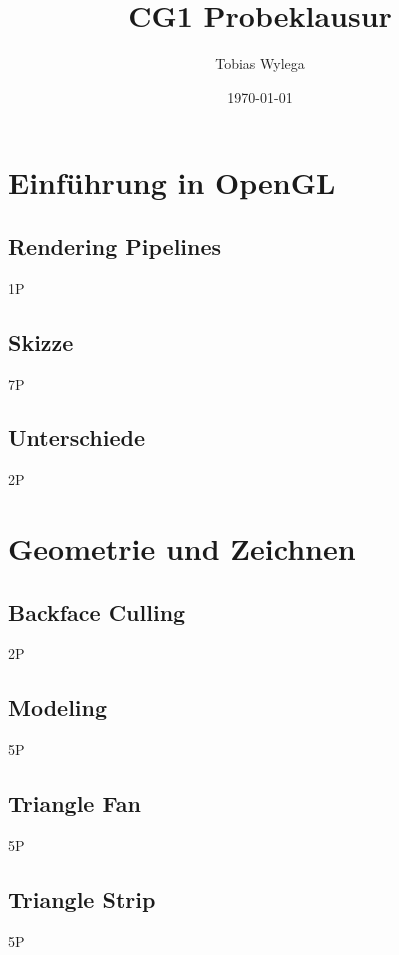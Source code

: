 \documentclass{article}
\title{CG1 Probeklausur}
\author{Tobias Wylega}
\date{\today}
\def\points#1{\begin{flushright}#1\end{flushright}}
\begin{document}
\maketitle

\tableofcontents
\newpage

\section{Einführung in OpenGL}
\subsection{Rendering Pipelines}
 \points{1P}

\subsection{Skizze}
 \points{7P}

\subsection{Unterschiede}
 \points{2P}


\section{Geometrie und Zeichnen}
\subsection{Backface Culling}
 \points{2P}
\subsection{Modeling}
 \points{5P}
\subsection{Triangle Fan}
 \points{5P}
\subsection{Triangle Strip}
 \points{5P}
\end{document}
